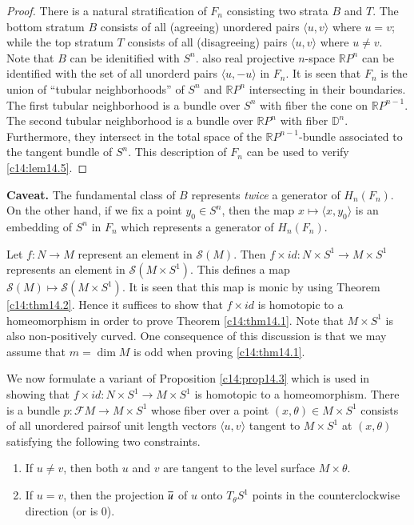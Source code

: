 \begin{proof}
  There is a natural stratification of $F_n$ consisting two strata $B$
  and $T$. The bottom stratum $B$ consists of all (agreeing) unordered
  pairs $\langle u, v \rangle$ where $u= v$; while the top stratum $T$
  consists of all (disagreeing) pairs $\langle u, v \rangle$ where $u
  \neq v$. Note that $B$ can be idenitified with $S^n$. also real
  projective $n$-space $\mathbb{R}P^n$ can be identified with the set
  of all unorderd pairs $\langle u, -u\rangle$ in $F_n$. It is seen
  that $F_n$ is the union of ``tubular neighborhoods'' of $S^n$ and
  $\mathbb{R}P^n$ intersecting in their boundaries. The first tubular
  neighborhood is a bundle over $S^n$ with fiber the cone on
  $\mathbb{R}P^{n-1}$. The second tubular neighborhood is a bundle
  over $\mathbb{R}P^n$ with fiber $\mathbb{D}^n$. Furthermore, they
  intersect in the total space of the $\mathbb{R} P^{n-1}$-bundle
  associated to the tangent bundle of $S^n$. This description of $F_n$
  can be used to verify \ref{c14:lem14.5}.
\end{proof}

\noindent\textbf{Caveat.} The fundamental class of $B$ represents
\textit{twice} a generator of $H_n (F_n)$. On the other hand, if we
fix a point $y_0 \in S^n$, then the map $x \mapsto \langle x,
y_0\rangle$ is an embedding of $S^n$ in $F_n$ which represents a
generator of $H_n (F_n)$.

Let $f: N \to M$ represent an element in $\mathcal{S}(M)$. Then $f
\times id: N \times S^1 \to M \times S^1$ represents an element in
$\mathcal{S}(M \times S^1)$. This defines a map $\mathcal{S}(M) \mapsto
\mathcal{S}(M \times S^1)$. It is seen that this map is monic by using
Theorem \ref{c14:thm14.2}. Hence it suffices to show that $f \times
id$ is homotopic to a homeomorphism in order to prove Theorem
\ref{c14:thm14.1}. Note that $M \times S^1$ is also non-positively
curved. One consequence of this discussion is that we may assume that
$m = \dim M$ is odd when proving \ref{c14:thm14.1}.

We now formulate a variant of Proposition \ref{c14:prop14.3} which is
used in showing that $f \times id: N \times S^1 \to M \times S^1$ is
homotopic to a homeomorphism. There is a bundle $p : \mathcal{F} M \to
M \times S^1$ whose fiber over a point $(x, \theta) \in M \times S^1$
consists of all unordered pairs\pageoriginale of unit length vectors
$\langle u, v\rangle$ tangent to $M \times S^1$ at $(x, \theta)$
satisfying the following two constraints.
\begin{enumerate}
\item If $u \neq v$, then both $u$ and $v$ are tangent to the level
  surface $M \times \theta$.
  \item If $u = v$, then the projection $\overline{u}$ of $u$ onto $T_\theta
    S^1$ points in the counterclockwise direction (or is 0).
\end{enumerate}

